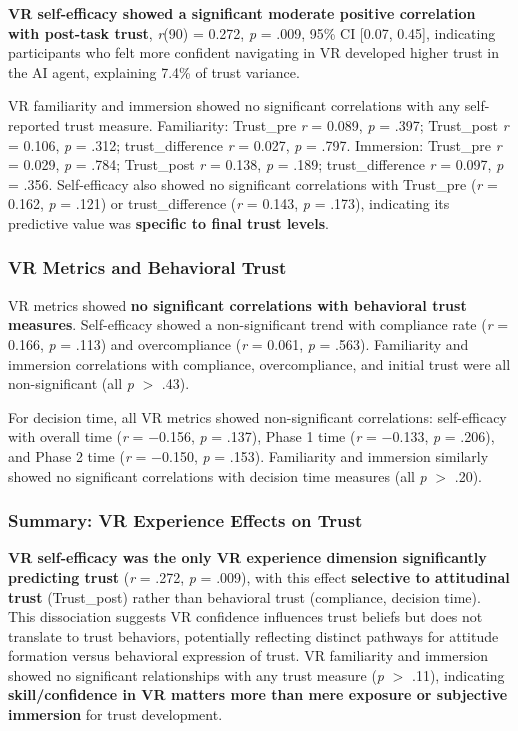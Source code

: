 \documentclass[12pt]{article}
\begin{document}
\textbf{VR self-efficacy showed a significant moderate positive correlation with post-task trust}, \textit{r}(90) = 0.272, \textit{p} = .009, 95\% CI [0.07, 0.45], indicating participants who felt more confident navigating in VR developed higher trust in the AI agent, explaining 7.4\% of trust variance.

VR familiarity and immersion showed no significant correlations with any self-reported trust measure. Familiarity: Trust\_pre \textit{r} = 0.089, \textit{p} = .397; Trust\_post \textit{r} = 0.106, \textit{p} = .312; trust\_difference \textit{r} = 0.027, \textit{p} = .797. Immersion: Trust\_pre \textit{r} = 0.029, \textit{p} = .784; Trust\_post \textit{r} = 0.138, \textit{p} = .189; trust\_difference \textit{r} = 0.097, \textit{p} = .356. Self-efficacy also showed no significant correlations with Trust\_pre (\textit{r} = 0.162, \textit{p} = .121) or trust\_difference (\textit{r} = 0.143, \textit{p} = .173), indicating its predictive value was \textbf{specific to final trust levels}.

\subsubsection{VR Metrics and Behavioral Trust}

VR metrics showed \textbf{no significant correlations with behavioral trust measures}. Self-efficacy showed a non-significant trend with compliance rate (\textit{r} = 0.166, \textit{p} = .113) and overcompliance (\textit{r} = 0.061, \textit{p} = .563). Familiarity and immersion correlations with compliance, overcompliance, and initial trust were all non-significant (all \textit{p} $>$ .43).

For decision time, all VR metrics showed non-significant correlations: self-efficacy with overall time (\textit{r} = $-$0.156, \textit{p} = .137), Phase 1 time (\textit{r} = $-$0.133, \textit{p} = .206), and Phase 2 time (\textit{r} = $-$0.150, \textit{p} = .153). Familiarity and immersion similarly showed no significant correlations with decision time measures (all \textit{p} $>$ .20).

\subsubsection{Summary: VR Experience Effects on Trust}

\textbf{VR self-efficacy was the only VR experience dimension significantly predicting trust} (\textit{r} = .272, \textit{p} = .009), with this effect \textbf{selective to attitudinal trust} (Trust\_post) rather than behavioral trust (compliance, decision time). This dissociation suggests VR confidence influences trust beliefs but does not translate to trust behaviors, potentially reflecting distinct pathways for attitude formation versus behavioral expression of trust. VR familiarity and immersion showed no significant relationships with any trust measure (\textit{p} $>$ .11), indicating \textbf{skill/confidence in VR matters more than mere exposure or subjective immersion} for trust development.
\end{document}
